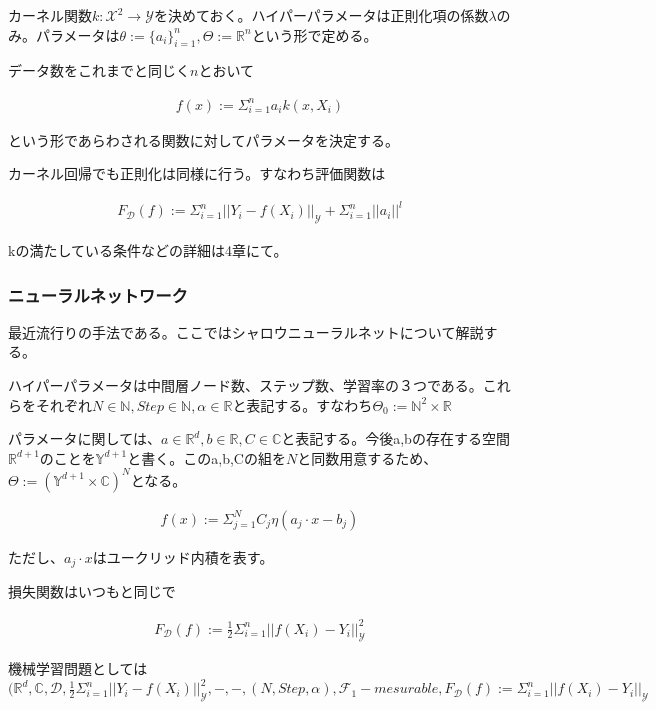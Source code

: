 \documentclass[dvipdfmx, a4paper]{jsarticle}
\begin{document}
カーネル関数$k:\mathcal{X}^2\to\mathcal{Y}$を決めておく。ハイパーパラメータは正則化項の係数$\lambda$のみ。パラメータは$\theta:=\{a_i\}^n_{i=1},\Theta:=\mathbb{R}^n$という形で定める。

データ数をこれまでと同じく$n$とおいて

\begin{align}
f(x):=\Sigma_{i=1}^na_ik(x,X_i)
\end{align}

という形であらわされる関数に対してパラメータを決定する。

カーネル回帰でも正則化は同様に行う。すなわち評価関数は

\begin{align}
F_\mathcal{D}(f):=\Sigma_{i=1}^n||Y_i-f(X_i)||_\mathcal{Y}+\Sigma_{i=1}^n||a_i||^l
\end{align}

kの満たしている条件などの詳細は4章にて。

\subsubsection{ニューラルネットワーク}
最近流行りの手法である。ここではシャロウニューラルネットについて解説する。

ハイパーパラメータは中間層ノード数、ステップ数、学習率の３つである。これらをそれぞれ$N\in\mathbb{N},Step\in\mathbb{N},\alpha\in\mathbb{R}$と表記する。すなわち$\Theta_0:=\mathbb{N}^2\times\mathbb{R}$

パラメータに関しては、$a\in\mathbb{R}^d,b\in\mathbb{R},C\in\mathbb{C}$と表記する。今後a,bの存在する空間$\mathbb{R}^{d+1}$のことを$\mathbb{Y}^{d+1}$と書く。このa,b,Cの組を$N$と同数用意するため、$\Theta:=(\mathbb{Y}^{d+1}\times\mathbb{C})^N$となる。

\begin{align}
f(x):=\Sigma_{j=1}^NC_j\eta(a_j\cdot x-b_j)
\end{align}

ただし、$a_j\cdot x$はユークリッド内積を表す。

損失関数はいつもと同じで

\begin{align}
F_\mathcal{D}(f):=\frac{1}{2}\Sigma^n_{i=1}||f(X_i)-Y_i||^2_\mathcal{Y}
\end{align}

機械学習問題としては$(\mathbb{R}^d,\mathbb{C},\mathcal{D},\frac{1}{2}\Sigma^n_{i=1}||Y_i-f(X_i)||_\mathcal{Y}^2,-,-,(N,Step,\alpha),\mathcal{F}_1-mesurable,F_\mathcal{D}(f):=\Sigma^n_{i=1}||f(X_i)-Y_i||_\mathcal{Y}$
\end{document}
